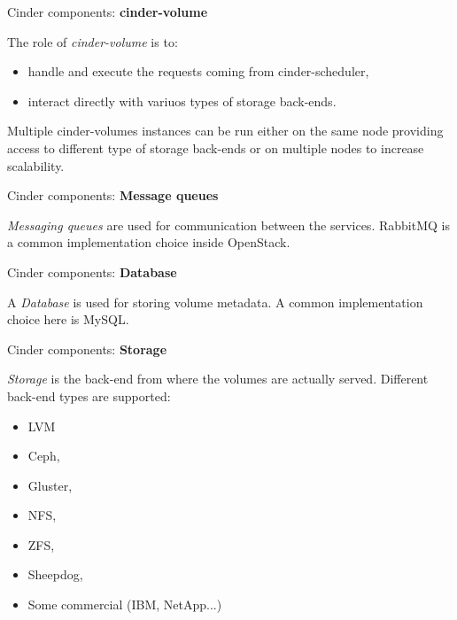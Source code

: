 \documentclass[english,serif,mathserif]{beamer}
\begin{document}
\begin{frame}{Cinder components: \textbf{cinder-volume}}

The role of \textit{cinder-volume} is to:
\begin{itemize}
\item handle and execute the requests coming from cinder-scheduler,
\item interact directly with variuos types of storage back-ends.
\end{itemize}

Multiple cinder-volumes instances can be run either on the same node 
providing access to different type of storage back-ends or on multiple 
nodes to increase scalability.

\end{frame}

\begin{frame}{Cinder components: \textbf{Message queues}}

\textit{Messaging queues} are used for communication between the services.
RabbitMQ is a common implementation choice inside OpenStack.  

\end{frame}

\begin{frame}{Cinder components: \textbf{Database}}

A \textit{Database} is used for storing volume metadata. 
A common implementation choice here is MySQL. 

\end{frame}

\begin{frame}{Cinder components: \textbf{Storage}}

\textit{Storage} is the back-end from where the volumes are actually served. 
Different back-end types are supported:

\begin{itemize}
\item LVM 
\item Ceph,
\item Gluster,
\item NFS,
\item ZFS,
\item Sheepdog,
\item Some commercial (IBM, NetApp...)
\end{itemize} 

\end{frame}
\end{document}
